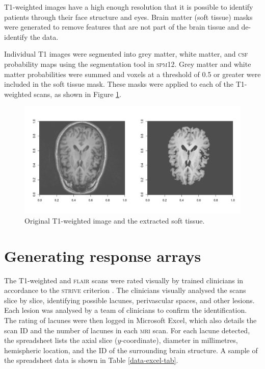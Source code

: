 T1-weighted images have a high enough resolution that it is possible to identify patients through their face structure and eyes. Brain matter (soft tissue) masks were generated to remove features that are not part of the brain tissue and de-identify the data.

Individual T1 images were segmented into grey matter, white matter, and \textsc{csf} probability maps using the segmentation tool in \textsc{spm12}. Grey matter and white matter probabilities were summed and voxels at a threshold of 0.5 or greater were included in the soft tissue mask. These masks were applied to each of the T1-weighted scans, as shown in Figure \ref{data-t1-soft-fig}.

\begin{figure}[ht]
\centering
\includegraphics[width=\linewidth]{Images/6_t1_soft_eg.png}
\caption{Original T1-weighted image and the extracted soft tissue.}
\label{data-t1-soft-fig}
\end{figure}

\section{Generating response arrays}\label{data-lacune}

The T1-weighted and \textsc{flair} scans were rated visually by trained clinicians in accordance to the \textsc{strive} criterion \cite{WardlawJ.M.2013Nsfr}. The clinicians visually analysed the scans slice by slice, identifying possible lacunes, perivascular spaces, and other lesions. Each lesion was analysed by a team of clinicians to confirm the identification. The rating of lacunes were then logged in Microsoft Excel, which also details the scan ID and the number of lacunes in each \textsc{mri} scan. For each lacune detected, the spreadsheet lists the axial slice ($y$-coordinate), diameter in millimetres, hemispheric location, and the ID of the surrounding brain structure. A sample of the spreadsheet data is shown in Table \ref{data-excel-tab}.

